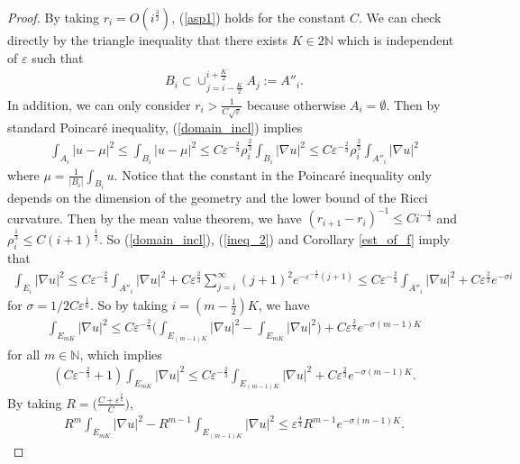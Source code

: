 \documentclass[11pt]{amsart}
\theoremstyle{plain}
\theoremstyle{definition}
\numberwithin{equation}{section}
\renewcommand{\leq}{\leqslant}
\begin{document}
\begin{proof}
By taking $r_i=O(i^{\frac{3}{2}})$, (\ref{asp1}) holds for the constant $C$. We can check directly by the triangle inequality that there exists $K\in 2\mathbb{N}$ which is independent of $\varepsilon$ such that
\begin{align}
B_i\subset \cup_{j=i-\frac{K}{2}}^{i+\frac{K}{2}}A_j:=A''_i.
\end{align}
In addition, we can only consider $r_i>\frac{1}{C\sqrt{\varepsilon}}$ because otherwise $A_i=\emptyset$. Then by standard Poincar\'e inequality, (\ref{domain_incl}) implies
\begin{align}
\int_{A_i}|u-\mu|^2\leq \int_{B_i}|u-\mu|^2\leq C\varepsilon^{-\frac{2}{3}}\rho_i^{\frac{2}{3}}\int_{B_i}|\nabla u|^2\leq C\varepsilon^{-\frac{2}{3}}\rho_i^{\frac{2}{3}}\int_{A''_{i}}|\nabla u|^2
\end{align}
where $\mu=\frac{1}{|B_i|}\int_{B_i}u$. Notice that the constant in the Poincar\'e inequality only depends on the dimension of the geometry and the lower bound of the Ricci curvature. Then by the mean value theorem, we have $(r_{i+1}-r_i)^{-1}\leq C i^{-\frac{1}{2}}$ and $\rho_i^{\frac{1}{3}}\leq C(i+1)^{\frac{1}{2}}$. So (\ref{domain_incl}), (\ref{ineq_2}) and Corollary \ref{est_of_f} imply that 
\begin{align}
\int_{E_{i}}|\nabla u|^2\leq C\varepsilon^{-\frac{2}{3}}
\int_{A''_{i}}|\nabla u|^2+C\varepsilon^{\frac{2}{3}}\sum_{j=i}^{\infty}(j+1)^2e^{-\varepsilon^{-\frac{1}{6}}(j+1)}
\leq C\varepsilon^{-\frac{2}{3}}\int_{A''_{i}}|\nabla u|^2+C\varepsilon^{\frac{2}{3}}
e^{-\sigma i}
\end{align}
for $\sigma=1/2C\varepsilon^{\frac{1}{6}}$. So by taking $i=(m-\frac{1}{2}) K$, we have
\begin{align}
\int_{E_{mK}}|\nabla u|^2\leq C\varepsilon^{-\frac{2}{3}}\Bigg(\int_{E_{(m-1)K}}|\nabla u|^2-\int_{E_{mK}}|\nabla u|^2\Bigg)+C\varepsilon^{\frac{2}{3}}
e^{-\sigma (m-1)K}
\end{align}
for all $m\in\mathbb{N}$, which implies
\begin{align}
(C\varepsilon^{-\frac{2}{3}}+1)\int_{E_{mK}}|\nabla u|^2\leq C\varepsilon^{-\frac{2}{3}} \int_{E_{(m-1)K}}|\nabla u|^2 +C\varepsilon^{\frac{2}{3}}
e^{-\sigma (m-1)K}.
\end{align}
By taking $R=\Big(\frac{C+\varepsilon^{\frac{2}{3}}}{C}\Big)$,
\begin{align}
R^{m}\int_{E_{mK}}|\nabla u|^2- R^{m-1}\int_{E_{(m-1)K}}|\nabla u|^2 \leq \varepsilon^{\frac{4}{3}} R^{m-1}e^{-\sigma (m-1)K}.
\end{align}

\end{proof}
\end{document}
